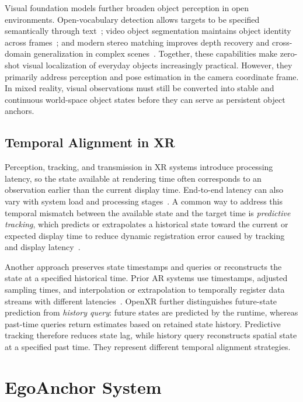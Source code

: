 \documentclass[review]{vgtc}
\begin{document}
Visual foundation models further broaden object perception in open environments. Open-vocabulary detection allows targets to be specified semantically through text~\cite{owlvit2022,glip2022,groundingdino2025,yoloe2025}; video object segmentation maintains object identity across frames~\cite{xmem2022,cutie2024}; and modern stereo matching improves depth recovery and cross-domain generalization in complex scenes~\cite{raftstereo2021,igevstereo2023,fastfoundationstereo2026}. Together, these capabilities make zero-shot visual localization of everyday objects increasingly practical. However, they primarily address perception and pose estimation in the camera coordinate frame. In mixed reality, visual observations must still be converted into stable and continuous world-space object states before they can serve as persistent object anchors.

\subsection{Temporal Alignment in XR}

Perception, tracking, and transmission in XR systems introduce processing latency, so the state available at rendering time often corresponds to an observation earlier than the current display time. End-to-end latency can also vary with system load and processing stages~\cite{diluca2010latency,mrloop2022,stauffert2020mtp}. A common way to address this temporal mismatch between the available state and the target time is \emph{predictive tracking}, which predicts or extrapolates a historical state toward the current or expected display time to reduce dynamic registration error caused by tracking and display latency~\cite{azuma1994improving,laviola2003double,pvt2023,yoon2022headmotion}.

Another approach preserves state timestamps and queries or reconstructs the state at a specified historical time. Prior AR systems use timestamps, adjusted sampling times, and interpolation or extrapolation to temporally register data streams with different latencies~\cite{jacobs1997latency}. OpenXR further distinguishes future-state prediction from \emph{history query}: future states are predicted by the runtime, whereas past-time queries return estimates based on retained state history. Predictive tracking therefore reduces state lag, while history query reconstructs spatial state at a specified past time. They represent different temporal alignment strategies.

\section{EgoAnchor System}\label{sec:system}
\end{document}
